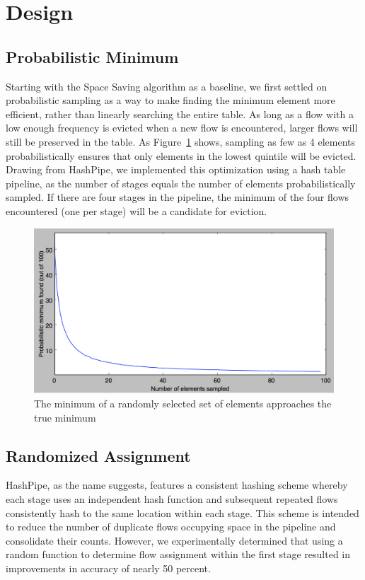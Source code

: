 \section{Design}
\label{sec:design}
\subsection{Probabilistic Minimum}
Starting with the Space Saving algorithm as a baseline, we first settled on probabilistic sampling as a way to make finding the minimum element more efficient, rather than linearly searching the entire table. As long as a flow with a low enough frequency is evicted when a new flow is encountered, larger flows will still be preserved in the table. As Figure~\ref{fig:probMin} shows, sampling as few as 4 elements probabilistically ensures that only elements in the lowest quintile will be evicted. Drawing from HashPipe, we implemented this optimization using a hash table pipeline, as the number of stages equals the number of elements probabilistically sampled. If there are four stages in the pipeline, the minimum of the four flows encountered (one per stage) will be a candidate for eviction. 
\begin{figure}[t]
  \centering
    \includegraphics[scale=0.32]{probMin}
     \caption{The minimum of a randomly selected set of elements approaches the true minimum}
     \label{fig:probMin}
\end{figure}
\subsection{Randomized Assignment}
HashPipe, as the name suggests, features a consistent hashing scheme whereby each stage uses an independent hash function and subsequent repeated flows consistently hash to the same location within each stage. This scheme is intended to reduce the number of duplicate flows occupying space in the pipeline and consolidate their counts. However, we experimentally determined that using a random function to determine flow assignment within the first stage resulted in improvements in accuracy of nearly 50 percent.

